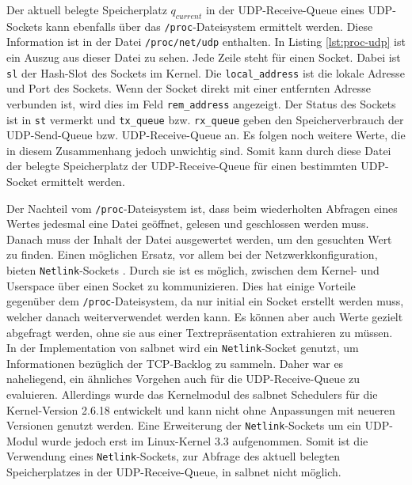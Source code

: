 \documentclass[a4paper, 12pt, BCOR10mm, DIV12, toc=bibliography, toc=listof, german]{scrbook}
\begin{document}
		Der aktuell belegte Speicherplatz $q_{current}$ in der UDP-Receive-Queue eines UDP-Sockets kann
		ebenfalls über das \texttt{/proc}-Dateisystem ermittelt werden. Diese Information ist in der
		Datei \texttt{/proc/net/udp} enthalten. In Listing \ref{lst:proc-udp} ist ein Auszug aus dieser
		Datei zu sehen. Jede Zeile steht für einen Socket. Dabei ist \texttt{sl} der Hash-Slot des
		Sockets im Kernel. Die \texttt{local\_address} ist die lokale Adresse und Port des Sockets. Wenn
		der Socket direkt  mit einer entfernten Adresse verbunden ist, wird dies im Feld
		\texttt{rem\_address} angezeigt.  Der Status des Sockets ist in \texttt{st} vermerkt und
		\texttt{tx\_queue} bzw.  \texttt{rx\_queue} geben den Speicherverbrauch der UDP-Send-Queue bzw.
		UDP-Receive-Queue an. Es folgen noch weitere Werte, die in diesem Zusammenhang jedoch unwichtig
		sind. Somit kann durch diese Datei der belegte Speicherplatz der UDP-Receive-Queue für einen
		bestimmten UDP-Socket ermittelt werden.

		Der Nachteil vom \texttt{/proc}-Dateisystem ist, dass beim wiederholten Abfragen eines Wertes
		jedesmal eine Datei geöffnet, gelesen und geschlossen werden muss. Danach muss der Inhalt der
		Datei ausgewertet werden, um den gesuchten Wert zu finden. Einen möglichen Ersatz, vor allem bei
		der Netzwerkkonfiguration, bieten \texttt{Netlink}-Sockets \cite{rfc3549, gusowski2009}.  Durch
		sie ist es möglich, zwischen dem Kernel- und Userspace über einen Socket zu kommunizieren.  Dies
		hat einige Vorteile gegenüber dem \texttt{/proc}-Dateisystem, da nur initial ein Socket erstellt
		werden muss, welcher danach weiterverwendet werden kann. Es können aber auch Werte gezielt
		abgefragt werden, ohne sie aus einer Textrepräsentation extrahieren zu müssen. In der
		Implementation von salbnet \cite{zinke2012,salbnet} wird ein \texttt{Netlink}-Socket genutzt, um
		Informationen bezüglich der TCP-Backlog zu sammeln. Daher war es naheliegend, ein ähnliches
		Vorgehen auch für die UDP-Receive-Queue zu evaluieren. Allerdings wurde das Kernelmodul des
		salbnet Schedulers für die Kernel-Version 2.6.18 entwickelt und kann nicht ohne Anpassungen mit
		neueren Versionen genutzt werden. Eine Erweiterung der \texttt{Netlink}-Sockets um ein UDP-Modul
		\cite{udpnetlink} wurde jedoch erst im Linux-Kernel 3.3 aufgenommen. Somit ist die Verwendung
		eines \texttt{Netlink}-Sockets, zur Abfrage des aktuell belegten Speicherplatzes in der
		UDP-Receive-Queue, in salbnet nicht möglich.

		
\end{document}
